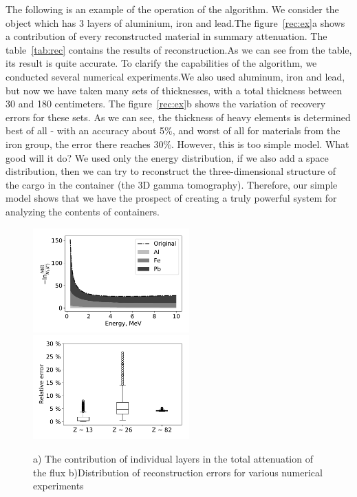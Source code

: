 \documentclass[a4paper]{panl}
\begin{document}
The following is an example of the operation of the algorithm. We consider the object which has 3 layers of aluminium, iron and lead.The figure~\ref{rec:ex}a shows a contribution of every reconstructed material in summary attenuation. The table~\ref{tab:rec} contains the results of reconstruction.As we can see from the table, its result is quite accurate. To clarify the capabilities of the algorithm, we conducted several numerical experiments.We also used aluminum, iron and lead, but now we have taken many sets of thicknesses, with a total thickness between 30 and 180 centimeters. The figure~\ref{rec:ex}b shows the variation of recovery errors for these sets. As we can see, the thickness of heavy elements is determined best of all - with an accuracy about 5\%, and worst of all for materials from the iron group, the error there reaches 30\%. However, this is too simple model. What good will it do? We used only the energy distribution, if we also add a space distribution, then we can try to reconstruct the three-dimensional structure of the cargo in the container (the 3D gamma tomography). Therefore, our simple model shows that we have the prospect of creating a truly powerful system for analyzing the contents of containers.
\begin{figure}[t]
    \begin{center}
        \includegraphics[width=60mm]{figures/reconstruction.pdf} 
        \includegraphics[width=60mm]{figures/relError.pdf}  
        \vspace{-3mm}
        \caption{a) The contribution of individual layers in the total attenuation of the flux b)Distribution of reconstruction errors for various numerical experiments}
    \end{center}
    \vspace{-5mm}
\end{figure}
\end{document}
